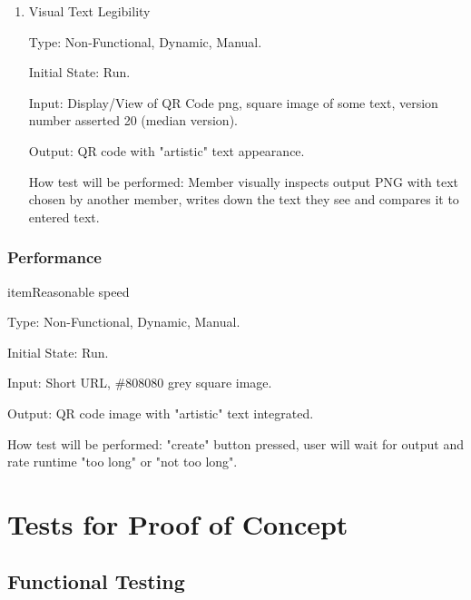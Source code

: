 \documentclass[12pt, titlepage]{article}
\begin{document}
\begin{enumerate}
\begin{enumerate}
\item{Visual Text Legibility\\}

Type: Non-Functional, Dynamic, Manual.
					
Initial State: Run.
					
Input: Display/View of QR Code png, square image of some text, version number asserted 20 (median version).
					
Output: QR code with "artistic" text appearance.
					
How test will be performed: Member visually inspects output PNG with text chosen by another member, writes down the text they see and compares it to entered text.

\end{enumerate}

\subsubsection{Performance}

item{Reasonable speed\\}

Type: Non-Functional, Dynamic, Manual.
					
Initial State: Run. 
					
Input: Short URL, \#808080 grey square image.
					
Output: QR code image with "artistic" text integrated.
					
How test will be performed: "create" button pressed, user will wait for output and rate runtime "too long" or "not too long".

\end{enumerate}

\section{Tests for Proof of Concept}

\subsection{Functional Testing}
\end{document}
